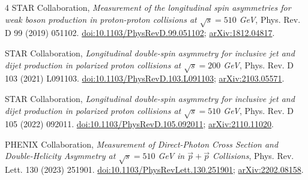 \documentclass[11pt,a4paper]{article}
\begin{document}
\begin{thebibliography}{4}
 STAR Collaboration,
\emph{Measurement of the longitudinal spin asymmetries for weak boson production in proton-proton collisions at $\sqrt{s}=510$ GeV},
Phys. Rev. D 99 (2019) 051102.
\href{https://doi.org/10.1103/PhysRevD.99.051102}{doi:10.1103/PhysRevD.99.051102};
\href{https://arxiv.org/abs/1812.04817}{arXiv:1812.04817}.

 STAR Collaboration,
\emph{Longitudinal double-spin asymmetry for inclusive jet and dijet production in polarized proton collisions at $\sqrt{s}=200$ GeV},
Phys. Rev. D 103 (2021) L091103.
\href{https://doi.org/10.1103/PhysRevD.103.L091103}{doi:10.1103/PhysRevD.103.L091103};
\href{https://arxiv.org/abs/2103.05571}{arXiv:2103.05571}.

 STAR Collaboration,
\emph{Longitudinal double-spin asymmetry for inclusive jet and dijet production in polarized proton collisions at $\sqrt{s}=510$ GeV},
Phys. Rev. D 105 (2022) 092011.
\href{https://doi.org/10.1103/PhysRevD.105.092011}{doi:10.1103/PhysRevD.105.092011};
\href{https://arxiv.org/abs/2110.11020}{arXiv:2110.11020}.

 PHENIX Collaboration,
\emph{Measurement of Direct-Photon Cross Section and Double-Helicity Asymmetry at $\sqrt{s}=510$ GeV in $\vec p+\vec p$ Collisions},
Phys. Rev. Lett. 130 (2023) 251901.
\href{https://doi.org/10.1103/PhysRevLett.130.251901}{doi:10.1103/PhysRevLett.130.251901};
\href{https://arxiv.org/abs/2202.08158}{arXiv:2202.08158}.
\end{thebibliography}
\end{document}
